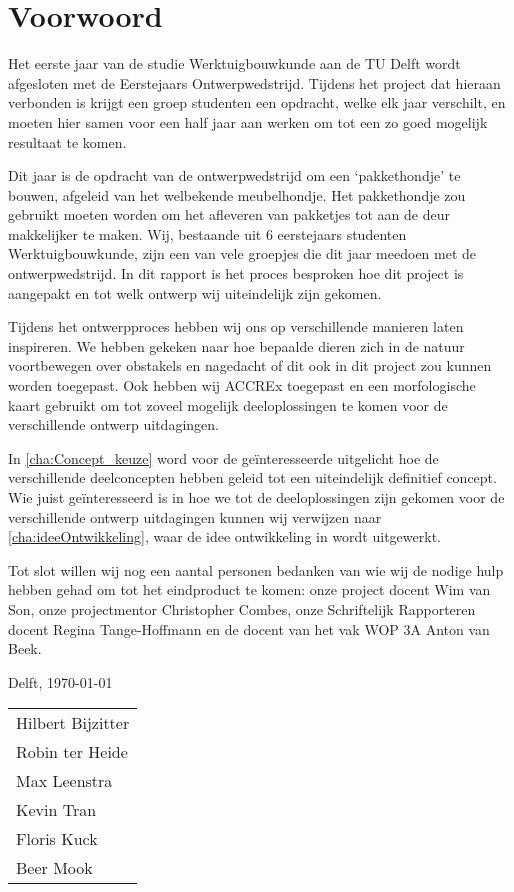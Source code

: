 \chapter*{Voorwoord}
\label{cha:voorwoord}

Het eerste jaar van de studie Werktuigbouwkunde aan de TU Delft wordt afgesloten met de  Eerstejaars Ontwerpwedstrijd. Tijdens het project dat hieraan verbonden is krijgt een groep studenten een opdracht, welke elk jaar verschilt, en moeten hier samen voor een half jaar aan werken om tot een zo goed mogelijk resultaat te komen. 

Dit jaar is de opdracht van de ontwerpwedstrijd om een ‘pakkethondje’ te bouwen, afgeleid van het welbekende meubelhondje. Het pakkethondje zou gebruikt moeten worden om het afleveren van pakketjes tot aan de deur makkelijker te maken. Wij, bestaande uit 6 eerstejaars studenten Werktuigbouwkunde, zijn een van vele groepjes die dit jaar meedoen met de ontwerpwedstrijd. In dit rapport is het proces besproken hoe dit project is aangepakt en tot welk ontwerp wij uiteindelijk zijn gekomen.

Tijdens het ontwerpproces hebben wij ons op verschillende manieren laten inspireren. We hebben gekeken naar hoe bepaalde dieren zich in de natuur voortbewegen over obstakels en nagedacht of dit ook in dit project zou kunnen worden toegepast. Ook hebben wij ACCREx toegepast en een morfologische kaart gebruikt om tot zoveel mogelijk deeloplossingen te komen voor de verschillende ontwerp uitdagingen.

In \cref{cha:Concept_keuze} word voor de geïnteresseerde uitgelicht hoe de verschillende deelconcepten hebben geleid tot een uiteindelijk definitief concept. Wie juist geïnteresseerd is in hoe we tot de deeloplossingen zijn gekomen voor de verschillende ontwerp uitdagingen kunnen wij verwijzen naar \cref{cha:ideeOntwikkeling}, waar de idee ontwikkeling in wordt uitgewerkt.

Tot slot willen wij nog een aantal personen bedanken van wie wij de nodige hulp hebben gehad om tot het eindproduct te komen: onze project docent Wim van Son, onze projectmentor Christopher Combes, onze Schriftelijk Rapporteren docent Regina Tange-Hoffmann en de docent van het vak WOP 3A Anton van Beek.

\vspace{\baselineskip}
Delft, \today\\
\begin{table}[h]
    \begin{tabular}{l}
        Hilbert Bijzitter\\
        Robin ter Heide\\
        Max Leenstra\\
        Kevin Tran\\
        Floris Kuck\\
        Beer Mook
    \end{tabular}
\end{table}

\vspace{\baselineskip}


